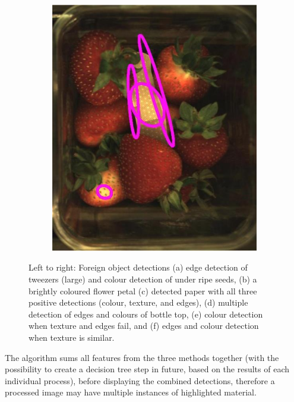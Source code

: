 \documentclass[fleqn,twoside,12pt]{report}
\begin{document}
\begin{figure}[h]
\begin{subfigure}{.25\textwidth}
		\caption{}
		\label{fig:fo_5}
	\end{subfigure}%
	\begin{subfigure}{.25\textwidth}
		\centering
		\includegraphics[width=.9\linewidth]{fo_6.jpg}
		\caption{}
		\label{fig:fo_6}
	\end{subfigure}%
	
	\caption{Left to right: Foreign object detections (a) edge detection of tweezers (large) and colour detection of under ripe seeds, (b) a brightly coloured flower petal (c) detected paper with all three positive detections (colour, texture, and edges), (d) multiple detection of edges and colours of bottle top, (e) colour detection when texture and edges fail, and (f) edges and colour detection when texture is similar.}
	\label{fig:fo_process}
\end{figure}


The algorithm sums all features from the three methods together (with the possibility to create a decision tree step in future, based on the results of each individual process), before displaying the combined detections, therefore a processed image may have multiple instances of highlighted material.
\end{document}
